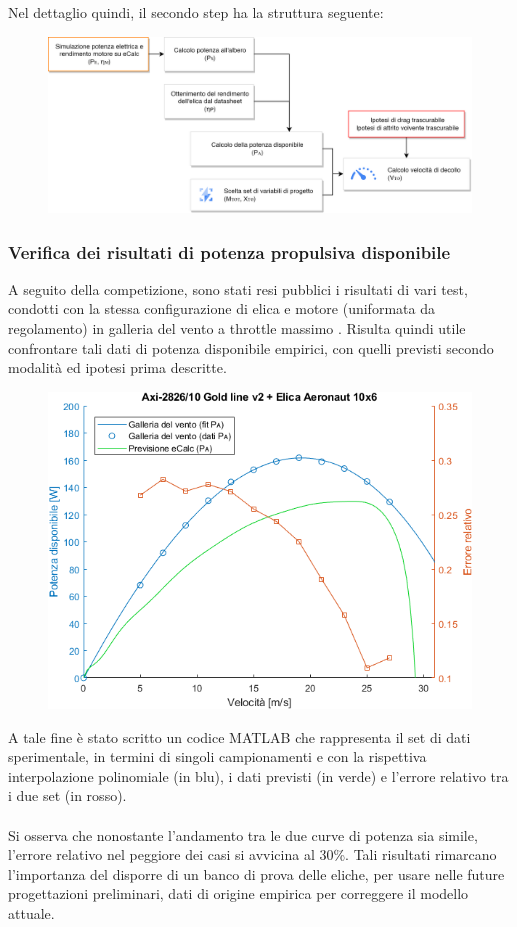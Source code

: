 \documentclass[12pt]{article}
\begin{document}
\noindent
Nel dettaglio quindi, il secondo step ha la struttura seguente:
\begin{figure}[!h]
	\centering
	\includegraphics[width=14cm]{img/dim-vto}
\end{figure}

\subsubsection{Verifica dei risultati di potenza propulsiva disponibile}
A seguito della competizione, sono stati resi pubblici i risultati di vari test, condotti con la stessa configurazione di elica e motore (uniformata da regolamento) in galleria del vento a throttle massimo \cite{windtunnel}. Risulta quindi utile confrontare tali dati di potenza disponibile empirici, con quelli previsti secondo modalità ed ipotesi prima descritte.

\begin{figure}[h]
	\centering
	\includegraphics[width=13cm]{img/plot-PA-crop}
\end{figure}

\noindent
A tale fine è stato scritto un codice MATLAB che rappresenta il set di dati sperimentale, in termini di singoli campionamenti e con la rispettiva interpolazione polinomiale (in blu), i dati previsti (in verde) e l'errore relativo tra i due set (in rosso). 
\\\\
Si osserva che nonostante l'andamento tra le due curve di potenza sia simile, l'errore relativo nel peggiore dei casi si avvicina al 30\%. Tali risultati rimarcano l'importanza del disporre di un banco di prova delle eliche, per usare nelle future progettazioni preliminari, dati di origine empirica per correggere il modello attuale.
\end{document}
